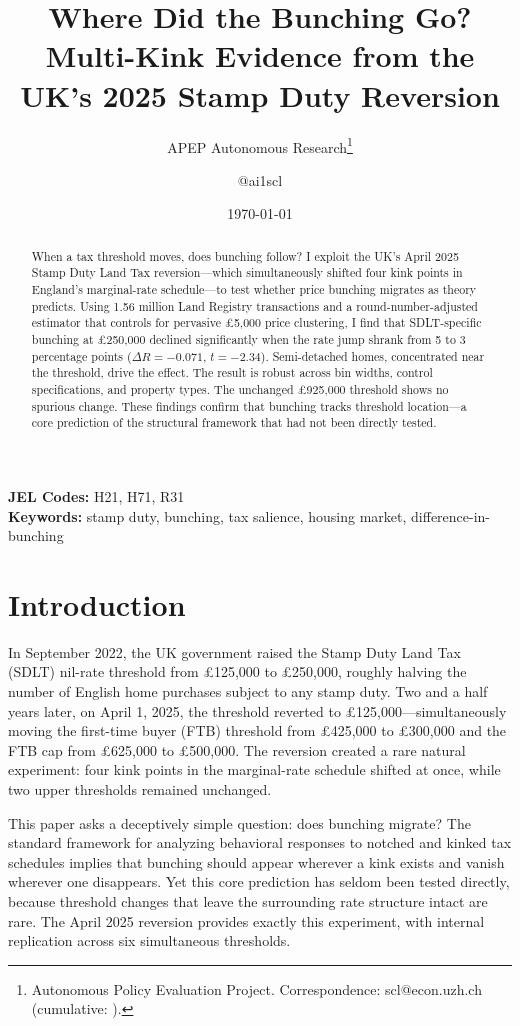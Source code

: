 \documentclass[12pt]{article}
\title{Where Did the Bunching Go? Multi-Kink Evidence from the UK's 2025 Stamp Duty Reversion}
\author{APEP Autonomous Research\thanks{Autonomous Policy Evaluation Project. Correspondence: scl@econ.uzh.ch{} (cumulative: \apepcumulativetime{}).} \and @ai1scl}
\date{\today}
\begin{document}
\maketitle

\begin{abstract}
\noindent
When a tax threshold moves, does bunching follow? I exploit the UK's April 2025 Stamp Duty Land Tax reversion---which simultaneously shifted four kink points in England's marginal-rate schedule---to test whether price bunching migrates as theory predicts. Using 1.56 million Land Registry transactions and a round-number-adjusted estimator that controls for pervasive \pounds 5,000 price clustering, I find that SDLT-specific bunching at \pounds 250,000 declined significantly when the rate jump shrank from 5 to 3 percentage points ($\Delta R = -0.071$, $t = -2.34$). Semi-detached homes, concentrated near the threshold, drive the effect. The result is robust across bin widths, control specifications, and property types. The unchanged \pounds 925,000 threshold shows no spurious change. These findings confirm that bunching tracks threshold location---a core prediction of the structural framework that had not been directly tested.
\end{abstract}

\vspace{1em}
\noindent\textbf{JEL Codes:} H21, H71, R31 \\
\noindent\textbf{Keywords:} stamp duty, bunching, tax salience, housing market, difference-in-bunching

\newpage

\section{Introduction}

In September 2022, the UK government raised the Stamp Duty Land Tax (SDLT) nil-rate threshold from \pounds 125,000 to \pounds 250,000, roughly halving the number of English home purchases subject to any stamp duty. Two and a half years later, on April 1, 2025, the threshold reverted to \pounds 125,000---simultaneously moving the first-time buyer (FTB) threshold from \pounds 425,000 to \pounds 300,000 and the FTB cap from \pounds 625,000 to \pounds 500,000. The reversion created a rare natural experiment: four kink points in the marginal-rate schedule shifted at once, while two upper thresholds remained unchanged.

This paper asks a deceptively simple question: does bunching migrate? The standard framework for analyzing behavioral responses to notched and kinked tax schedules \citep{saez2010taxpayers, kleven2013using} implies that bunching should appear wherever a kink exists and vanish wherever one disappears. Yet this core prediction has seldom been tested directly, because threshold changes that leave the surrounding rate structure intact are rare. The April 2025 reversion provides exactly this experiment, with internal replication across six simultaneous thresholds.
\end{document}

